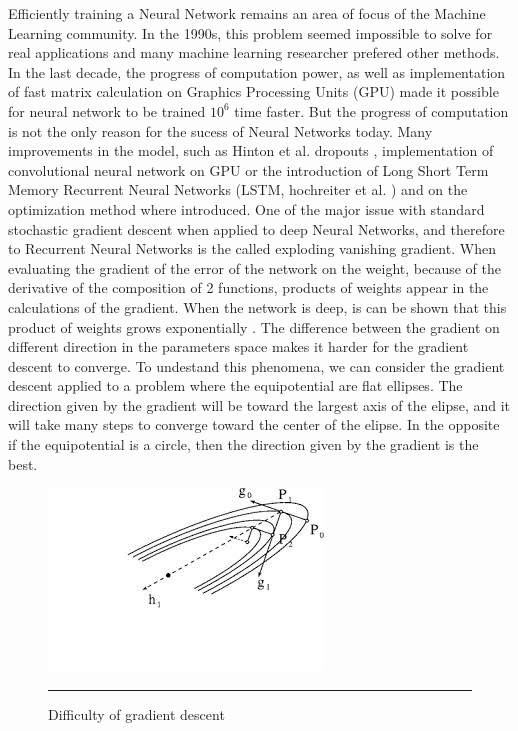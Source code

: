 Efficiently training a Neural Network remains an area of focus of the Machine Learning community. In the 1990s, this problem seemed impossible to solve for real applications and many machine learning researcher prefered other methods. In the last decade, the progress of computation power, as well as implementation of fast matrix calculation on Graphics Processing Units (GPU) made it possible for neural network to be trained $10^6$ time faster. But the progress of computation is not the only reason for the sucess of Neural Networks today. Many improvements in the model, such as Hinton et al. dropouts \cite{dahl2013improving}, implementation of convolutional neural network on GPU \cite{krizhevsky2012imagenet} or the introduction of Long Short Term Memory Recurrent Neural Networks (LSTM, hochreiter et al. \cite{hochreiter1997long}) and on the optimization method where introduced. One of the major issue with standard stochastic gradient descent when applied to deep Neural Networks, and therefore to Recurrent Neural Networks is the called exploding vanishing gradient. When evaluating the gradient of the error of the network on the weight, because of the derivative of the composition of 2 functions, products of weights appear in the calculations of the gradient. When the network is deep, is can be shown that this product of weights grows exponentially \cite{pascanu2012difficulty}. The difference between the gradient on different direction in the parameters space makes it harder for the gradient descent to converge. To undestand this phenomena, we can consider the gradient descent applied to a problem where the equipotential are flat ellipses. The direction given by the gradient will be toward the largest axis of the elipse, and it will take many steps to converge toward the center of the elipse. In the opposite if the equipotential is a circle, then the direction given by the gradient is the best. 


\begin{figure}[htbp]
    \centering
    \includegraphics[scale=0.7]{Figures/gradient_ellipse.jpg}
    \rule{35em}{0.5pt}
    \caption[Difficulty of gradient descent]{Difficulty of gradient descent}
    \label{fig:gradient_elipse}
\end{figure}

